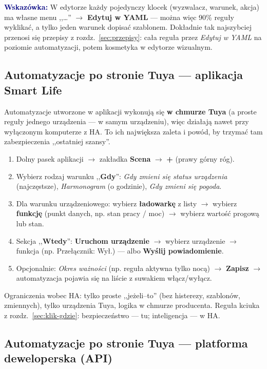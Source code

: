 \documentclass[11pt,a4paper]{article}
\newcommand{\wskazowka}[1]{\par\medskip\noindent\textcolor{navy}{\textbf{Wskazówka:}} #1\par\medskip}
\begin{document}
\wskazowka{W edytorze każdy pojedynczy klocek (wyzwalacz, warunek, akcja) ma własne menu ,,\ldots'' $\to$ \textbf{Edytuj w YAML} --- można więc 90\% reguły wyklikać, a tylko jeden warunek dopisać szablonem. Dokładnie tak najszybciej przenosi się przepisy z rozdz.~\ref{sec:przepisy}: cała reguła przez \emph{Edytuj w YAML} na poziomie automatyzacji, potem kosmetyka w edytorze wizualnym.}

\subsection{Automatyzacje po stronie Tuya --- aplikacja Smart Life}
\label{sec:klik-smartlife}

Automatyzacje utworzone w aplikacji wykonują się \textbf{w chmurze Tuya} (a proste reguły jednego urządzenia --- w samym urządzeniu), więc działają nawet przy wyłączonym komputerze z HA. To ich największa zaleta i powód, by trzymać tam zabezpieczenia ,,ostatniej szansy''.

\begin{enumerate}
\item Dolny pasek aplikacji $\to$ zakładka \textbf{Scena} $\to$ \textbf{+} (prawy górny róg).
\item Wybierz rodzaj warunku ,,\textbf{Gdy}'': \emph{Gdy zmieni się status urządzenia} (najczęstsze), \emph{Harmonogram} (o godzinie), \emph{Gdy zmieni się pogoda}.
\item Dla warunku urządzeniowego: wybierz \textbf{ładowarkę} z listy $\to$ wybierz \textbf{funkcję} (punkt danych, np. stan pracy / moc) $\to$ wybierz wartość progową lub stan.
\item Sekcja ,,\textbf{Wtedy}'': \textbf{Uruchom urządzenie} $\to$ wybierz urządzenie $\to$ funkcja (np. Przełącznik: Wył.) --- albo \textbf{Wyślij powiadomienie}.
\item Opcjonalnie: \emph{Okres ważności} (np. reguła aktywna tylko nocą) $\to$ \textbf{Zapisz} $\to$ automatyzacja pojawia się na liście z suwakiem włącz/wyłącz.
\end{enumerate}

Ograniczenia wobec HA: tylko proste ,,jeżeli--to'' (bez histerezy, szablonów, zmiennych), tylko urządzenia Tuya, logika w chmurze producenta. Reguła kciuka z rozdz.~\ref{sec:klik-gdzie}: bezpieczeństwo --- tu; inteligencja --- w HA.

\subsection{Automatyzacje po stronie Tuya --- platforma deweloperska (API)}
\label{sec:klik-dev}
\end{document}
